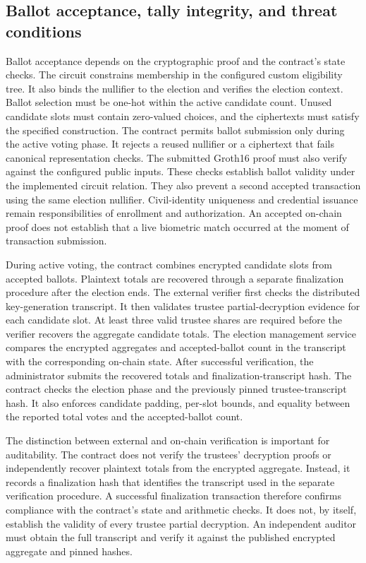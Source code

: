 \subsection{Ballot acceptance, tally integrity, and threat conditions}
\label{subsec:system-security-objectives}

Ballot acceptance depends on the cryptographic proof and the contract's state
checks. The circuit constrains membership in the configured custom
eligibility tree. It also binds the nullifier to the election and verifies the
election context. Ballot selection must be one-hot within the active candidate
count. Unused candidate slots must contain zero-valued choices, and the
ciphertexts must satisfy the specified construction.
The contract permits ballot submission only during the active voting phase.
It rejects a reused nullifier or a ciphertext that fails canonical
representation checks. The submitted Groth16 proof must also verify against
the configured public inputs. These checks establish ballot validity under
the implemented circuit relation. They also prevent a second accepted
transaction using the same election nullifier.
Civil-identity uniqueness and credential issuance remain responsibilities of
enrollment and authorization. An accepted on-chain proof does not establish
that a live biometric match occurred at the moment of transaction submission.

During active voting, the contract combines encrypted candidate slots from
accepted ballots. Plaintext totals are recovered through a separate
finalization procedure after the election ends. The external verifier first
checks the distributed key-generation transcript. It then validates trustee
partial-decryption evidence for each candidate slot.
At least three valid trustee shares are required before the verifier recovers
the aggregate candidate totals. The election management service compares
the encrypted aggregates and accepted-ballot count in the transcript with
the corresponding on-chain state. After successful verification, the
administrator submits the recovered totals and finalization-transcript hash.
The contract checks the election phase and the previously pinned
trustee-transcript hash. It also enforces candidate padding, per-slot bounds,
and equality between the reported total votes and the accepted-ballot count.

The distinction between external and on-chain verification is important for
auditability. The contract does not verify the trustees' decryption proofs or
independently recover plaintext totals from the encrypted aggregate. Instead,
it records a finalization hash that identifies the transcript used in the
separate verification procedure.
A successful finalization transaction therefore confirms compliance with the
contract's state and arithmetic checks. It does not, by itself, establish
the validity of every trustee partial decryption. An independent auditor must
obtain the full transcript and verify it against the published encrypted
aggregate and pinned hashes.

